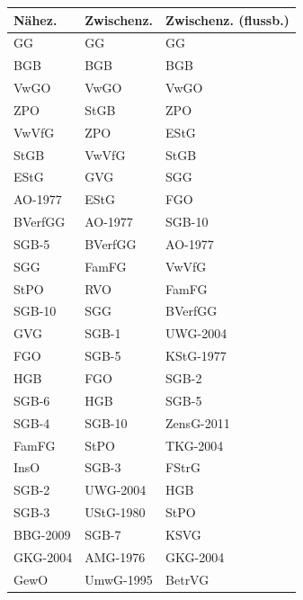 \begin{tabular}{lll}
\toprule
  Nähez. & Zwischenz. & Zwischenz. (flussb.) \\
\midrule
      GG &         GG &                   GG \\
     BGB &        BGB &                  BGB \\
    VwGO &       VwGO &                 VwGO \\
     ZPO &       StGB &                  ZPO \\
   VwVfG &        ZPO &                 EStG \\
    StGB &      VwVfG &                 StGB \\
    EStG &        GVG &                  SGG \\
 AO-1977 &       EStG &                  FGO \\
 BVerfGG &    AO-1977 &               SGB-10 \\
   SGB-5 &    BVerfGG &              AO-1977 \\
     SGG &      FamFG &                VwVfG \\
    StPO &        RVO &                FamFG \\
  SGB-10 &        SGG &              BVerfGG \\
     GVG &      SGB-1 &             UWG-2004 \\
     FGO &      SGB-5 &            KStG-1977 \\
     HGB &        FGO &                SGB-2 \\
   SGB-6 &        HGB &                SGB-5 \\
   SGB-4 &     SGB-10 &           ZensG-2011 \\
   FamFG &       StPO &             TKG-2004 \\
    InsO &      SGB-3 &                FStrG \\
   SGB-2 &   UWG-2004 &                  HGB \\
   SGB-3 &  UStG-1980 &                 StPO \\
BBG-2009 &      SGB-7 &                 KSVG \\
GKG-2004 &   AMG-1976 &             GKG-2004 \\
    GewO &  UmwG-1995 &               BetrVG \\
\bottomrule
\end{tabular}
